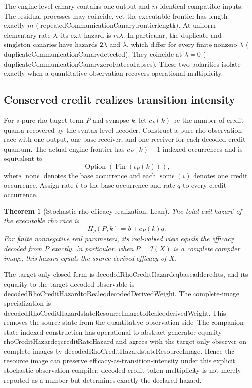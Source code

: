 \documentclass[11pt]{article}
\newtheorem{theorem}{Theorem}[section]
\newcommand{\Fin}{\operatorname{Fin}}
\newcommand{\Option}{\operatorname{Option}}
\newcommand{\some}{\operatorname{some}}
\newcommand{\none}{\operatorname{none}}
\newcommand{\leanname}[1]{{\scriptsize\ttfamily
  \def\_{\textunderscore\allowbreak}#1}}
\begin{document}
The engine-level canary contains one output and \(m\) identical compatible
inputs.  The residual processes may coincide, yet the executable frontier has
length exactly \(m\)
(\leanname{repeatedCommunicationCanary\_frontier\_length}).  At uniform
elementary rate \(\lambda\), its exit hazard is \(m\lambda\).  In particular,
the duplicate and singleton canaries have hazards \(2\lambda\) and
\(\lambda\), which differ for every finite nonzero \(\lambda\)
(\leanname{duplicateCommunicationCanary\_detected}).  They coincide at
\(\lambda=0\)
(\leanname{duplicateCommunicationCanary\_zeroRate\_collapses}).  These two
polarities isolate exactly when a quantitative observation recovers
operational multiplicity.

\subsection{Conserved credit realizes transition intensity}

For a pure-rho target term \(P\) and synapse \(k\), let \(c_P(k)\) be the
number of credit quanta recovered by the syntax-level decoder.  Construct a
pure-rho observation race with one output, one base receiver, and one receiver
for each decoded credit quantum.  The actual engine frontier has
\(c_P(k)+1\) indexed occurrences and is equivalent to
\[
  \Option(\Fin(c_P(k))),
\]
where \(\none\) denotes the base occurrence and each \(\some(i)\) denotes one
credit occurrence.  Assign rate \(b\) to the base occurrence and rate \(q\)
to every credit occurrence.

\begin{theorem}[Stochastic-rho efficacy realization; Lean]
The total exit hazard of the executable rho race is
\[
 H_\rho(P,k)=b+c_P(k)q.
\]
For finite nonnegative real parameters, its real-valued view equals the
efficacy decoded from \(P\) exactly.  In particular, when
\(P=\mathcal I(X)\) is a complete compiler image, this hazard equals the
source derived efficacy of \(X\).
\end{theorem}

The target-only closed form is
\leanname{decodedRhoCreditHazard\_eq\_base\_add\_credits}, and its equality to
the target-decoded observable is
\leanname{decodedRhoCreditHazard\_toReal\_eq\_decodedDerivedWeight}.  The
complete-image specialization is
\leanname{decodedRhoCreditHazard\_stateResourceImage\_toReal\_eq\_derivedWeight}.
This removes the source state from the quantitative observation side.  The
companion state-indexed construction has operational-to-abstract generator
equality \leanname{rhoCreditHazard\_eq\_creditRateHazard} and agrees with the
target-only observer on complete images by
\leanname{decodedRhoCreditHazard\_stateResourceImage}.  Hence the resource
image can preserve efficacy-as-transition-intensity under this explicit
stochastic observation compiler: decoded credit-token multiplicity is not
merely reported as a number but determines exactly the declared hazard.
\end{document}
